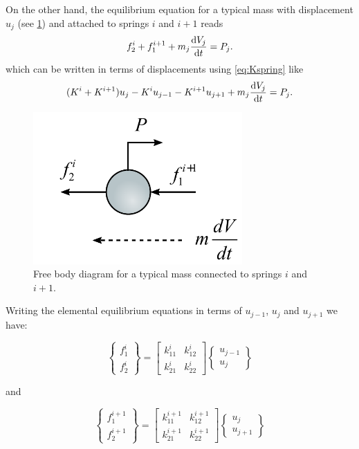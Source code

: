 On the other hand, the equilibrium equation for a typical mass with displacement $u_j$  (see \cref{fig:dclmass}) and attached to springs $i$ and $i+1$ reads
\begin{equation}
f_2^i + f_1^{i + 1} + m_j \dv{V_j}{t} = P_j.
\label{eq:equilmass}
\end{equation}
which can be written in terms of displacements using \cref{eq:Kspring} like
\[(K^i + K^{i + 1}) u_j - K^i u_{j - 1} - K^{i + 1} u_{j + 1} + m_j\dv{V_j}{t} = P_j .\]


\begin{figure}[H]
\centering
\includegraphics[width=8cm]{dcl_mass.pdf}
\caption{Free body diagram for a typical mass connected to springs $i$ and $i+1$.}
\label{fig:dclmass}
\end{figure}


Writing the elemental equilibrium equations in terms of $u_{j - 1}$, $u_j$ and $u_{j + 1}$ we have:

\[\left\{ {\begin{array}{*{20}{c}}
{f_1^i}\\
{f_2^i}
\end{array}} \right\} = \left[ {\begin{array}{*{20}{c}}
{k_{11}^i}&{k_{12}^i}\\
{k_{21}^i}&{k_{22}^i}
\end{array}} \right]\left\{ {\begin{array}{*{20}{c}}
{{u_{j - 1}}}\\
{{u_j}}
\end{array}} \right\}\]

and

\[\left\{ {\begin{array}{*{20}{c}}
{f_1^{i + 1}}\\
{f_2^{i + 1}}
\end{array}} \right\} = \left[ {\begin{array}{*{20}{c}}
{k_{11}^{i + 1}}&{k_{12}^{i + 1}}\\
{k_{21}^{i + 1}}&{k_{22}^{i + 1}}
\end{array}} \right]\left\{ {\begin{array}{*{20}{c}}
{{u_j}}\\
{{u_{j + 1}}}
\end{array}} \right\}\]

